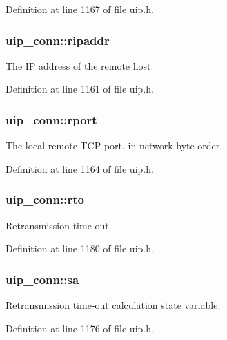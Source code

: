 Definition at line 1167 of file uip.h.

\hypertarget{structuip__conn_a79510aa86d3fa0a0fc6cfc49b1da7279}{
\subsubsection[{ripaddr}]{ {\bf uip\_\-conn::ripaddr}}}
\label{structuip__conn_a79510aa86d3fa0a0fc6cfc49b1da7279}
The IP address of the remote host. 

Definition at line 1161 of file uip.h.

\hypertarget{structuip__conn_a1df6aa054ef2fa634ac4c6f418228285}{
\subsubsection[{rport}]{ {\bf uip\_\-conn::rport}}}
\label{structuip__conn_a1df6aa054ef2fa634ac4c6f418228285}
The local remote TCP port, in network byte order. 

Definition at line 1164 of file uip.h.

\hypertarget{structuip__conn_ae3aa9cc25e45b663e6aabc54c013019e}{
\subsubsection[{rto}]{ {\bf uip\_\-conn::rto}}}
\label{structuip__conn_ae3aa9cc25e45b663e6aabc54c013019e}
Retransmission time-\/out. 

Definition at line 1180 of file uip.h.

\hypertarget{structuip__conn_aef661afb3aa82f0437d2ed8d3c20be76}{
\subsubsection[{sa}]{ {\bf uip\_\-conn::sa}}}
\label{structuip__conn_aef661afb3aa82f0437d2ed8d3c20be76}
Retransmission time-\/out calculation state variable. 

Definition at line 1176 of file uip.h.


